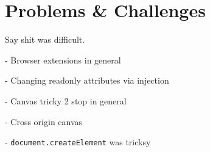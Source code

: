 \chapter{Problems \& Challenges}

Say shit was difficult.

- Browser extensions in general

- Changing readonly attributes via injection

- Canvas tricky 2 stop in general

- Cross origin canvas

- \texttt{document.createElement} was tricksy
